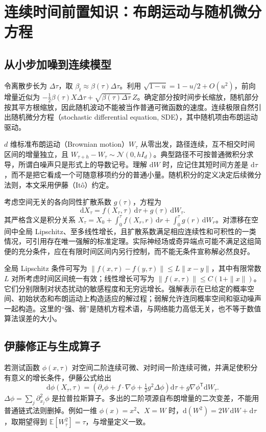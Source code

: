 \documentclass[UTF8,12pt,a4paper,fontset=fandol]{ctexart}
\begin{document}
\section{连续时间前置知识：布朗运动与随机微分方程}
\label{sec:diff-sde}
\subsection{从小步加噪到连续模型}
令离散步长为 $\Delta\tau$，取 $\beta_t\approx\beta(\tau)\Delta\tau$。利用 $\sqrt{1-u}=1-u/2+O(u^2)$，前向增量近似为 $-\tfrac12\beta(\tau)X\Delta\tau+\sqrt{\beta(\tau)\Delta\tau}\,Z$。确定部分按时间步长缩放，随机部分按其平方根缩放，因此随机波动不能被当作普通可微函数的速度。连续极限自然引出随机微分方程（stochastic differential equation, SDE），其中随机项由布朗运动驱动。

$d$ 维标准布朗运动（Brownian motion）$W_\tau$ 从零出发，路径连续，互不相交时间区间的增量独立，且 $W_{\tau+h}-W_\tau\sim\mathcal N(0,hI_d)$。典型路径不可按普通微积分求导，所谓白噪声只是形式上的导数记号。理解 $\mathrm dW$ 时，应记住其短时间方差是 $\mathrm d\tau$，而不是把它看成一个可随意移项约分的普通小量。随机积分的定义决定后续微分法则，本文采用伊藤（Itô）约定。

考虑空间无关的各向同性扩散系数 $g(\tau)$，方程为
\begin{equation}
 \mathrm dX_\tau=f(X_\tau,\tau)\,\mathrm d\tau+g(\tau)\,\mathrm dW_\tau.
 \label{eq:diff-forward-sde}
\end{equation}
其严格含义是积分关系 $X_\tau=X_0+\int_0^\tau f(X_r,r)\,\mathrm dr+\int_0^\tau g(r)\,\mathrm dW_r$。对漂移在空间中全局 Lipschitz、至多线性增长，且扩散系数满足相应连续性和可积性的一类情况，可引用存在唯一强解的标准定理。实际神经场或奇异端点可能不满足这组简便的充分条件，应在有限时间区间内另行控制，而不能无条件宣称解必然良好。

全局 Lipschitz 条件可写为 $\|f(x,\tau)-f(y,\tau)\|\leq L\|x-y\|$，其中有限常数 $L$ 对所考虑时间区间统一有效；线性增长可写为 $\|f(x,\tau)\|\leq C(1+\|x\|)$。它们分别限制对状态扰动的敏感程度和无穷远增长。强解表示在已给定的概率空间、初始状态和布朗运动上构造适应的解过程；弱解允许连同概率空间和驱动噪声一起构造。这里的“强、弱”是随机方程术语，与网络能力高低无关，也不等于数值算法误差的大小。

\subsection{伊藤修正与生成算子}
若测试函数 $\phi(x,\tau)$ 对空间二阶连续可微、对时间一阶连续可微，并满足使积分有意义的增长条件，伊藤公式给出
\begin{equation}
 \mathrm d\phi(X_\tau,\tau)=
 \left(\partial_\tau\phi+f\cdot\nabla\phi+\tfrac12g^2\Delta\phi\right)\mathrm d\tau
 +g\nabla\phi^\mathsf T\mathrm dW_\tau.
 \label{eq:diff-ito}
\end{equation}
$\Delta\phi=\sum_j\partial_{x_j}^2\phi$ 是拉普拉斯算子。多出的二阶项源自布朗增量的二次变差，不能用普通链式法则删掉。例如一维 $\phi(x)=x^2$、$X=W$ 时，$\mathrm d(W^2)=2W\,\mathrm dW+\mathrm d\tau$，取期望得到 $\mathbb E[W_\tau^2]=\tau$，与增量定义一致。
\end{document}
